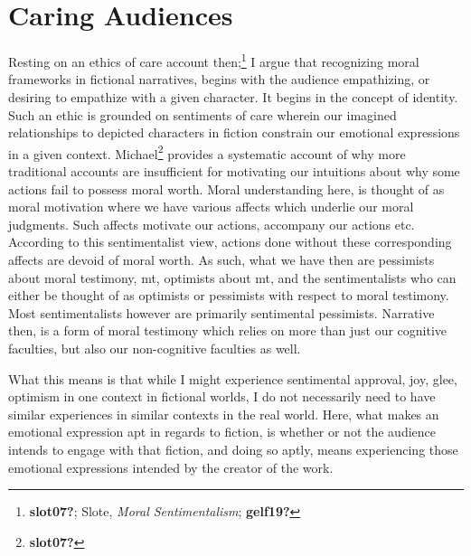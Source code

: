 \documentclass[phdthesis,12pt,final]{wuthesis}
\theoremstyle{definition}
\theoremstyle{definition}
\theoremstyle{definition}
\theoremstyle{definition}
\theoremstyle{remark}
\begin{document}
\section{Caring Audiences}\label{caring-audiences}

Resting on an ethics of care account then;\footnote{\textbf{slot07?}; Slote, \emph{Moral {Sentimentalism}}; \textbf{gelf19?}} I argue that recognizing moral frameworks in fictional narratives, begins with the audience empathizing, or desiring to empathize with a given character. It begins in the concept of identity. Such an ethic is grounded on sentiments of care wherein our imagined relationships to depicted characters in fiction constrain our emotional expressions in a given context. Michael\footnote{\textbf{slot07?}} provides a systematic account of why more traditional accounts are insufficient for motivating our intuitions about why some actions fail to possess moral worth. Moral understanding here, is thought of as moral motivation where we have various affects which underlie our moral judgments. Such affects motivate our actions, accompany our actions etc. According to this sentimentalist view, actions done without these corresponding affects are devoid of moral worth. As such, what we have then are pessimists about moral testimony, mt, optimists about mt, and the sentimentalists who can either be thought of as optimists or pessimists with respect to moral testimony. Most sentimentalists however are primarily sentimental pessimists. Narrative then, is a form of moral testimony which relies on more than just our cognitive faculties, but also our non-cognitive faculties as well.

What this means is that while I might experience sentimental approval, joy, glee, optimism in one context in fictional worlds, I do not necessarily need to have similar experiences in similar contexts in the real world. Here, what makes an emotional expression apt in regards to fiction, is whether or not the audience intends to engage with that fiction, and doing so aptly, means experiencing those emotional expressions intended by the creator of the work.
\end{document}
